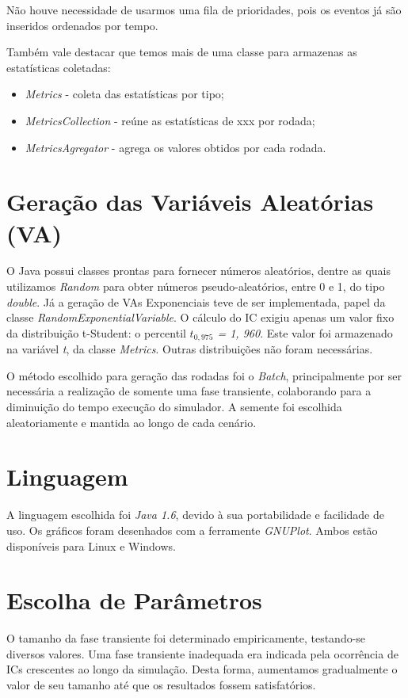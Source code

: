 \documentclass[a4paper,12pt]{report}
\begin{document}
Não houve necessidade de usarmos uma fila de prioridades, pois os eventos já são inseridos ordenados por tempo.

Também vale destacar que temos mais de uma classe para armazenas as estatísticas coletadas:
\begin{itemize}
  \item \textit{Metrics} - coleta das estatísticas por tipo;
  \item \textit{MetricsCollection} - reúne as estatísticas de xxx por rodada;
  \item \textit{MetricsAgregator} - agrega os valores obtidos por cada rodada.
\end{itemize}

\section{Geração das Variáveis Aleatórias (VA)}
O Java possui classes prontas para fornecer números aleatórios, dentre as quais utilizamos \textit{Random} para obter números pseudo-aleatórios, entre 0 e 1, do tipo \textit{double}. Já a geração de VAs Exponenciais teve de ser implementada, papel da classe \textit{RandomExponentialVariable}. O cálculo do IC exigiu apenas um valor fixo da distribuição t-Student: o percentil \textit{$t_{0,975}$ = 1, 960}. Este valor foi armazenado na variável \textit{t}, da classe \textit{Metrics}. Outras distribuições não foram necessárias.

O método escolhido para geração das rodadas foi o \textit{Batch}, principalmente por ser necessária a realização de somente uma fase transiente, colaborando para a diminuição do tempo execução do simulador. A semente foi escolhida aleatoriamente e mantida ao longo de cada cenário.

\section{Linguagem}
A linguagem escolhida foi \textit{Java 1.6}, devido à sua portabilidade e facilidade de uso. Os gráficos foram desenhados com a ferramente \textit{GNUPlot}. Ambos estão disponíveis para Linux e Windows.

\section{Escolha de Parâmetros}
O tamanho da fase transiente foi determinado empiricamente, testando-se diversos valores. Uma fase transiente inadequada era indicada pela ocorrência de ICs crescentes ao longo da simulação. Desta forma, aumentamos gradualmente o valor de seu tamanho até que os resultados fossem satisfatórios.
\end{document}
